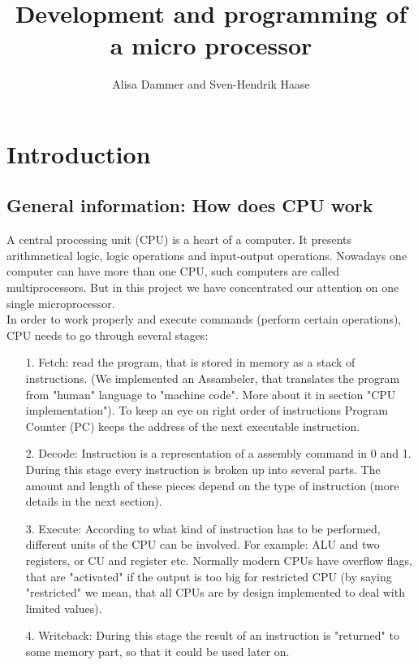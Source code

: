 \documentclass[11pt,a4paper]{article}
\begin{document}
\title{Development and programming of a micro processor}
\author{Alisa Dammer and Sven-Hendrik Haase}
\maketitle

\section{Introduction}
\subsection{General information: How does CPU work}
A central processing unit (CPU) is a heart of a computer. It presents arithmnetical logic, logic operations and input-output operations. Nowadays one computer can have more than one CPU, such computers are called multiprocessors. But in this project we have concentrated our attention on one single microprocessor.\\
In order to work properly and execute commands (perform certain operations), CPU needs to go through several stages:
\begin{enumerate}
	\item[1.] Fetch: read the program, that is stored in memory as a stack of instructions. (We implemented an Assambeler, that translates the program from "human" language to "machine code". More about it in  section "CPU implementation"). To keep an eye on right order of instructions Program Counter (PC) keeps the address of the next executable instruction.
	\item[2.] Decode: Instruction is a representation of a assembly command in 0 and 1. During this stage every instruction is broken up into several parts. The amount and length of these pieces depend on the type of instruction (more details in the next section). 
	\item[3.] Execute: According to what kind of instruction has to be performed, different units of the CPU can be involved. For example: ALU and two registers, or CU and register etc. Normally modern CPUs have overflow flags, that are "activated" if the output is too big for restricted CPU (by saying "restricted" we mean, that all CPUs are by design implemented to deal with limited values).
	\item[4.] Writeback: During this stage the result of an instruction is "returned" to some memory part, so that it could be used later on.
\end{enumerate}
\end{document}
